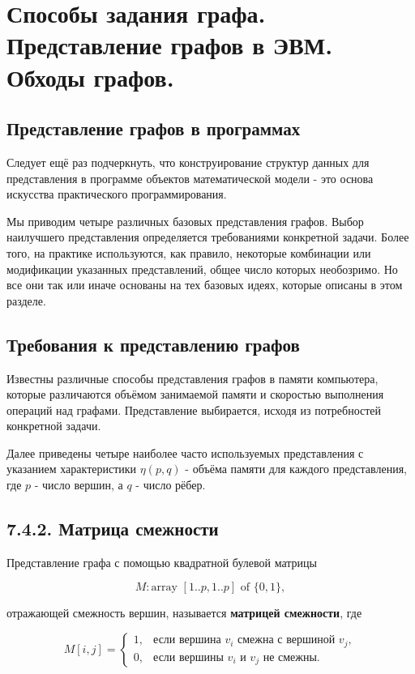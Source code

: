 {
	\section{Способы задания графа. Представление графов в ЭВМ. Обходы графов.}

	\subsection*{Представление графов в программах}

	Следует ещё раз подчеркнуть, что конструирование структур данных для представления в программе объектов математической модели - это основа искусства практического программирования.

	Мы приводим четыре различных базовых представления графов. Выбор наилучшего представления определяется требованиями конкретной задачи. Более того, на практике используются, как правило, некоторые комбинации или модификации указанных представлений, общее число которых необозримо. Но все они так или иначе основаны на тех базовых идеях, которые описаны в этом разделе.

	\subsection*{Требования к представлению графов}

	Известны различные способы представления графов в памяти компьютера, которые различаются объёмом занимаемой памяти и скоростью выполнения операций над графами. Представление выбирается, исходя из потребностей конкретной задачи.

	Далее приведены четыре наиболее часто используемых представления с указанием характеристики $\eta(p, q)$ - объёма памяти для каждого представления, где $p$ - число вершин, а $q$ - число рёбер.
	
	\subsection*{7.4.2. Матрица смежности}

	Представление графа с помощью квадратной булевой матрицы


	\[
	M : \text{array } [1..p, 1..p] \text{ of } \{0, 1\},
	\]


	отражающей смежность вершин, называется \textbf{матрицей смежности}, где


	\[
	M[i, j] =
	\begin{cases}
	1, & \text{если вершина } v_i \text{ смежна с вершиной } v_j, \\
	0, & \text{если вершины } v_i \text{ и } v_j \text{ не смежны}.
	\end{cases}
	\]



}
